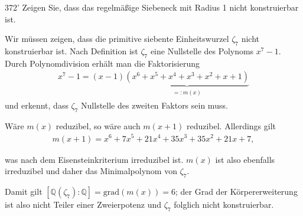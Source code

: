 \begin{algebraUE}{372'}
Zeigen Sie, dass das regelmäßige Siebeneck mit Radius 1 nicht konstruierbar ist.
\end{algebraUE}

\begin{solution}
  Wir müssen zeigen, dass die primitive siebente Einheitswurzel $\zeta_7$ nicht konstruierbar ist. Nach Definition ist $\zeta_7$ eine Nullstelle des Polynoms $x^7-1.$ Durch Polynomdivision erhält man die Faktorisierung
  \begin{align}
      x^7-1 = (x-1)\underbrace{(x^6+x^5+x^4+x^3+x^2+x+1)}_\substack{=: m(x)}
  \end{align}
  und erkennt, dass $\zeta_7$ Nullstelle des zweiten Faktors sein muss.

  Wäre $m(x)$ reduzibel, so wäre auch $m(x+1)$ reduzibel. Allerdings gilt
  \begin{align}
      m(x+1) = x^6+7x^5+21x^4+35x^3+35x^2+21x+7,
  \end{align}

  was nach dem Eisensteinkriterium irreduzibel ist. $m(x)$ ist also ebenfalls irreduzibel und daher das Minimalpolynom von $\zeta_7.$

  Damit gilt $[\mathbb{Q}(\zeta_7):\mathbb{Q}] = \mathrm{grad}(m(x)) = 6$; der Grad der Körpererweiterung ist also nicht Teiler einer Zweierpotenz und $\zeta_7$ folglich nicht konstruierbar.
\end{solution}
